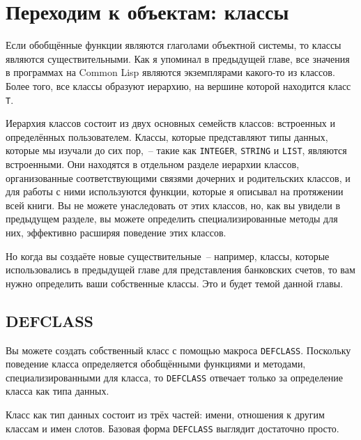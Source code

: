 \chapter{Переходим к объектам: классы}
\label{ch:17}

\thispagestyle{empty}

Если обобщённые функции являются глаголами объектной системы, то классы являются
существительными.  Как я упоминал в предыдущей главе, все значения в программах на Common
Lisp являются экземплярами какого-то из классов.  Более того, все классы образуют иерархию,
на вершине которой находится класс \lstinline{T}.

Иерархия классов состоит из двух основных семейств классов: встроенных и определённых
пользователем.  Классы, которые представляют типы данных, которые мы изучали до сих
пор,~-- такие как \lstinline{INTEGER}, \lstinline{STRING} и \lstinline{LIST}, являются встроенными.  Они
находятся в отдельном разделе иерархии классов, организованные соответствующими связями
дочерних и родительских классов, и для работы с ними используются функции, которые я
описывал на протяжении всей книги.  Вы не можете унаследовать от этих классов, но, как вы
увидели в предыдущем разделе, вы можете определить спе\-циа\-ли\-зи\-ро\-ван\-ные методы для них,
эффективно расширяя поведение этих классов.

Но когда вы создаёте новые существительные~-- например, классы, которые использовались в
предыдущей главе для представления банковских счетов, то вам нужно определить ваши
собственные классы.  Это и будет темой данной главы.

\section{DEFCLASS}

Вы можете создать собственный класс с помощью макроса \lstinline{DEFCLASS}.  Поскольку
поведение класса определяется обобщёнными функциями и методами, специализированными для
класса, то \lstinline{DEFCLASS} отвечает только за определение класса как типа данных.

Класс как тип данных состоит из трёх частей: имени, отношения к другим классам и имен
слотов.  Базовая форма \lstinline{DEFCLASS} выглядит
достаточно просто.

